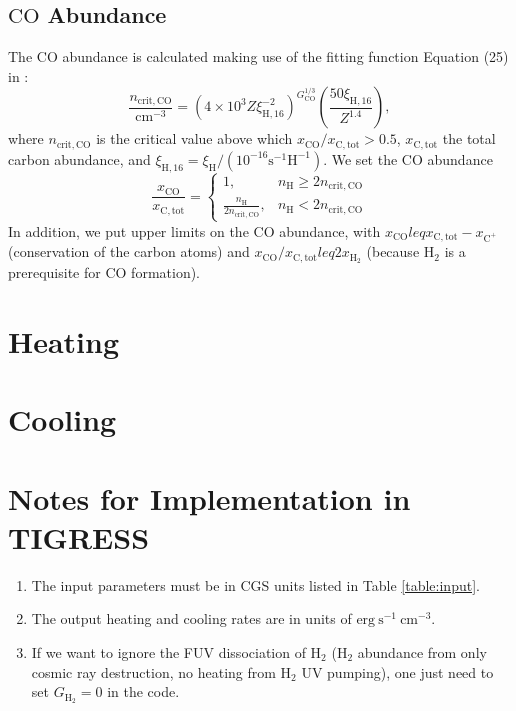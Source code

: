 \documentclass[iop,numberedappendix]{emulateapj}
\newcommand{\mr}{\mathrm}
\newcommand{\Ht}{\mathrm{H_2}}
\newcommand{\Ho}{\mathrm{H}}
\newcommand{\CO}{\mathrm{CO}}
\newcommand{\Cplus}{\mathrm{C^+}}
\begin{document}
\subsection{$\CO$ Abundance\label{section:CO}}
The $\CO$ abundance is calculated making use of the fitting function Equation
(25) in \citet{GOW2016}:
\begin{equation}\label{eq:CO_fit}
    \frac{n_\mr{crit, CO}}{\mr{cm^{-3}}} 
    = \left(4\times10^3 Z \xi_{\Ho,16}^{-2}\right)^{G_\CO^{1/3}}
    \left( \frac{50  \xi_{\Ho,16}}{Z^{1.4}}\right),
\end{equation}
where $n_\mr{crit, CO}$ is the critical value above which 
$x_\CO/x_\mr{C, tot} > 0.5$, $x_\mr{C, tot}$ the total carbon abundance, and
$\xi_{\Ho,16}=\xi_\Ho/(10^{-16}\mr{s^{-1}H^{-1}})$.
We set the $\CO$ abundance 
\begin{equation*}
    \frac{x_\CO}{x_\mr{C, tot}} =
    \begin{cases}
         1, & n_\Ho \geq 2 n_\mr{crit, CO}\\
         \frac{n_\Ho}{2 n_\mr{crit, CO}}, & n_\Ho < 2 n_\mr{crit, CO}
    \end{cases}
\end{equation*}
In addition, we put upper limits on the $\CO$ abundance, with 
$x_\CO leq x_\mr{C, tot} - x_\Cplus$ (conservation of the carbon atoms)
and $x_\CO/x_\mr{C, tot} leq 2 x_\Ht$
(because $\Ht$ is a prerequisite for $\CO$ formation).

\section{Heating}\label{section:heating}

\section{Cooling}\label{section:cooling}

\section{Notes for Implementation in TIGRESS}
\begin{enumerate}
    \item The input parameters must be in CGS units listed in Table
        \ref{table:input}.
    \item The output heating and cooling rates are in units of
        $\mr{erg~s^{-1}~cm^{-3}}$.
    \item If we want to ignore the FUV dissociation of $\Ht$ ($\Ht$ abundance
        from only cosmic ray destruction, no heating from $\Ht$ UV pumping),
        one just need to set $G_\Ht=0$ in the code.
\end{enumerate}




\end{document}

